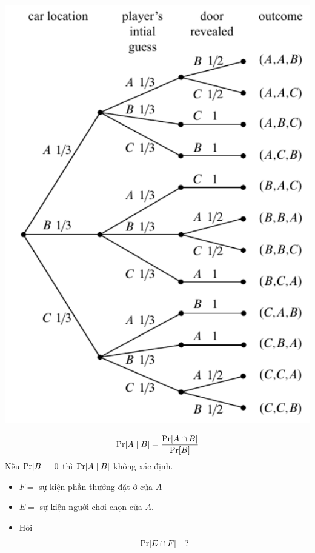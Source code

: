 \begin{frame}
  \begin{block}{}
    \begin{center}
      \includegraphics[scale=0.5]{fig175b.pdf}
    \end{center}
  \end{block}
\end{frame}


\begin{frame}
  \begin{dfntn}
    $$
    \mathrm{Pr} [A \mid B] = \frac{\mathrm{Pr}[A \cap B]}{\mathrm{Pr}[B]}
    $$
    Nếu $\mathrm{Pr} [B] = 0$ thì $\mathrm{Pr} [A \mid B]$ không xác định. 
  \end{dfntn}

  \begin{xmpl}
    \begin{itemize}
    \item $F = $ sự kiện phần thưởng đặt ở cửa $A$
    \item $E = $ sự kiện người chơi chọn cửa $A$.
    \item Hỏi 
      $$
      \mathrm{Pr} [E \cap F] = ?
      $$
    \end{itemize}
  \end{xmpl}
\end{frame}

